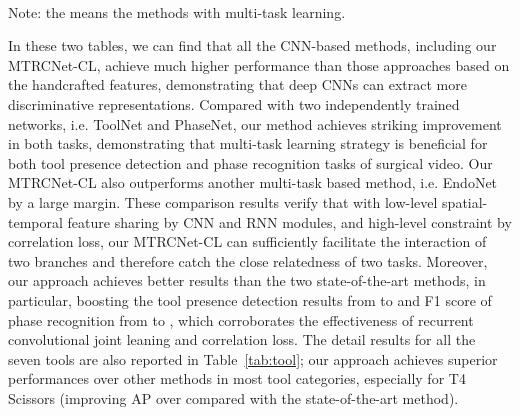 \documentclass{elsarticle}
\begin{document}
	\begin{table}[t]
\centering
		\caption{Phase recognition results using different approaches (rows).}
		\vspace{-3mm}
		\label{tab:phase}
			\\
			\vspace{0.5mm}
			\scriptsize Note: the  means the methods with multi-task learning. ~~~~~~~~~~~~~~~~~~~~							
\end{table}
		
		
		
		In these two tables, we can find that all the CNN-based methods, including our MTRCNet-CL, achieve much higher performance than those approaches based on the handcrafted features, demonstrating that deep CNNs can extract more discriminative representations.
		Compared with two independently trained networks, i.e. ToolNet and PhaseNet, our method achieves striking improvement in both tasks, demonstrating that multi-task learning strategy is beneficial for both tool presence detection and phase recognition tasks of surgical video.
		Our MTRCNet-CL also outperforms another multi-task based method, i.e. EndoNet by a large margin.
		These comparison results verify that with low-level spatial-temporal feature sharing by CNN and RNN modules, and high-level constraint by correlation loss, 
		our MTRCNet-CL can sufficiently facilitate the interaction of two branches and therefore catch the close relatedness of two tasks.
		Moreover, our approach achieves better results than the two state-of-the-art methods, in particular, boosting the tool presence detection results from  to  and F1 score of phase recognition from  to , which corroborates the effectiveness of recurrent convolutional joint leaning and correlation loss.
		The detail results for all the seven tools are also reported in Table~\ref{tab:tool}; our approach achieves superior performances over other methods in most tool categories, especially for T4 Scissors (improving AP over  compared with the state-of-the-art method).
		
\end{document}
